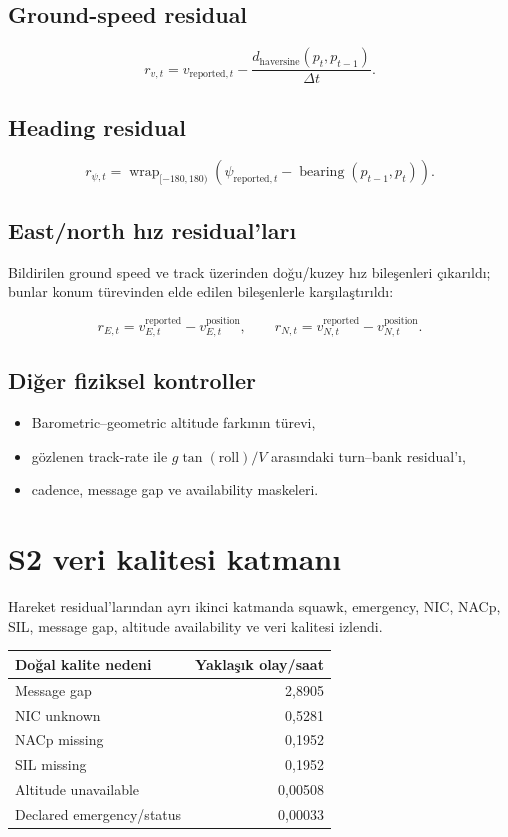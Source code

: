 \documentclass[11pt,a4paper,oneside]{report}
\begin{document}
\subsection{Ground-speed residual}

\[
r_{v,t}
= v_{\text{reported},t}
- \frac{d_{\text{haversine}}(p_t,p_{t-1})}{\Delta t}.
\]

\subsection{Heading residual}

\[
r_{\psi,t}
= \operatorname{wrap}_{[-180,180)}
\left(
\psi_{\text{reported},t}
- \operatorname{bearing}(p_{t-1},p_t)
\right).
\]

\subsection{East/north hız residual'ları}

Bildirilen ground speed ve track üzerinden doğu/kuzey hız bileşenleri
çıkarıldı; bunlar konum türevinden elde edilen bileşenlerle karşılaştırıldı:

\[
r_{E,t}=v^{\text{reported}}_{E,t}-v^{\text{position}}_{E,t},
\qquad
r_{N,t}=v^{\text{reported}}_{N,t}-v^{\text{position}}_{N,t}.
\]

\subsection{Diğer fiziksel kontroller}

\begin{itemize}
  \item Barometric--geometric altitude farkının türevi,
  \item gözlenen track-rate ile \(g\tan(\text{roll})/V\) arasındaki
  turn--bank residual'ı,
  \item cadence, message gap ve availability maskeleri.
\end{itemize}

\section{S2 veri kalitesi katmanı}

Hareket residual'larından ayrı ikinci katmanda squawk, emergency, NIC,
NACp, SIL, message gap, altitude availability ve veri kalitesi izlendi.

\begin{center}
\begin{tabular}{lr}
\toprule
\textbf{Doğal kalite nedeni} & \textbf{Yaklaşık olay/saat}\\
\midrule
Message gap & 2,8905\\
NIC unknown & 0,5281\\
NACp missing & 0,1952\\
SIL missing & 0,1952\\
Altitude unavailable & 0,00508\\
Declared emergency/status & 0,00033\\
\bottomrule
\end{tabular}
\end{center}
\end{document}
